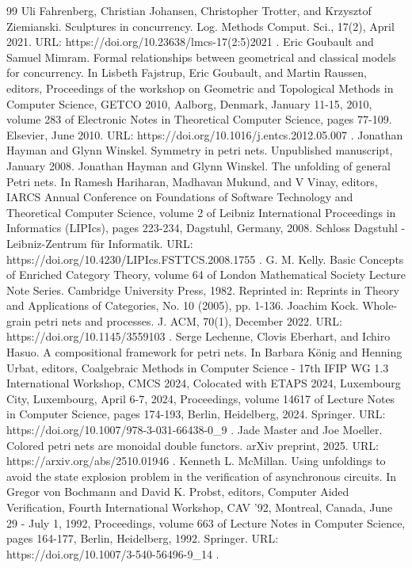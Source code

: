 \documentclass[10pt,a4paper]{amsart}
\begin{document}
\begin{thebibliography}{99}
 Uli Fahrenberg, Christian Johansen, Christopher Trotter, and Krzysztof Ziemianski. Sculptures in concurrency. Log. Methods Comput. Sci., 17(2), April 2021. URL: https://doi.org/10.23638/lmcs-17(2:5)2021 .
 Eric Goubault and Samuel Mimram. Formal relationships between geometrical and classical models for concurrency. In Lisbeth Fajstrup, Eric Goubault, and Martin Raussen, editors, Proceedings of the workshop on Geometric and Topological Methods in Computer Science, GETCO 2010, Aalborg, Denmark, January 11-15, 2010, volume 283 of Electronic Notes in Theoretical Computer Science, pages 77-109. Elsevier, June 2010. URL: https://doi.org/10.1016/j.entcs.2012.05.007 .
 Jonathan Hayman and Glynn Winskel. Symmetry in petri nets. Unpublished manuscript, January 2008.
 Jonathan Hayman and Glynn Winskel. The unfolding of general Petri nets. In Ramesh Hariharan, Madhavan Mukund, and V Vinay, editors, IARCS Annual Conference on Foundations of Software Technology and Theoretical Computer Science, volume 2 of Leibniz International Proceedings in Informatics (LIPIcs), pages 223-234, Dagstuhl, Germany, 2008. Schloss Dagstuhl - Leibniz-Zentrum für Informatik. URL: https://doi.org/10.4230/LIPIcs.FSTTCS.2008.1755 .
 G. M. Kelly. Basic Concepts of Enriched Category Theory, volume 64 of London Mathematical Society Lecture Note Series. Cambridge University Press, 1982. Reprinted in: Reprints in Theory and Applications of Categories, No. 10 (2005), pp. 1-136.
 Joachim Kock. Whole-grain petri nets and processes. J. ACM, 70(1), December 2022. URL: https://doi.org/10.1145/3559103 .
 Serge Lechenne, Clovis Eberhart, and Ichiro Hasuo. A compositional framework for petri nets. In Barbara König and Henning Urbat, editors, Coalgebraic Methods in Computer Science - 17th IFIP WG 1.3 International Workshop, CMCS 2024, Colocated with ETAPS 2024, Luxembourg City, Luxembourg, April 6-7, 2024, Proceedings, volume 14617 of Lecture Notes in Computer Science, pages 174-193, Berlin, Heidelberg, 2024. Springer. URL: https://doi.org/10.1007/978-3-031-66438-0\_9 .
 Jade Master and Joe Moeller. Colored petri nets are monoidal double functors. arXiv preprint, 2025. URL: https://arxiv.org/abs/2510.01946 .
 Kenneth L. McMillan. Using unfoldings to avoid the state explosion problem in the verification of asynchronous circuits. In Gregor von Bochmann and David K. Probst, editors, Computer Aided Verification, Fourth International Workshop, CAV '92, Montreal, Canada, June 29 - July 1, 1992, Proceedings, volume 663 of Lecture Notes in Computer Science, pages 164-177, Berlin, Heidelberg, 1992. Springer. URL: https://doi.org/10.1007/3-540-56496-9\_14 .

\end{thebibliography}
\end{document}
